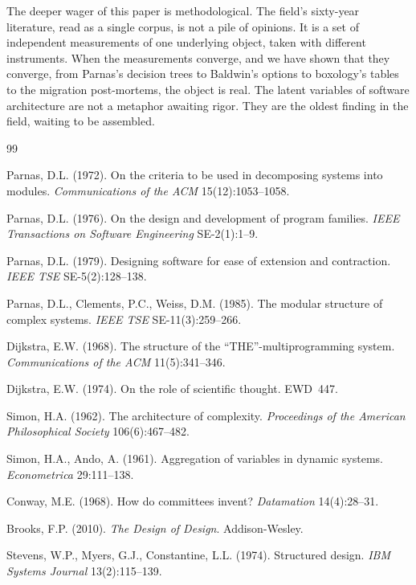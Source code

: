 \documentclass[11pt,oneside]{article}
\theoremstyle{definition}
\begin{document}
The deeper wager of this paper is methodological. The field's sixty-year literature, read as a
single corpus, is not a pile of opinions. It is a set of independent measurements of one
underlying object, taken with different instruments. When the measurements converge, and we
have shown that they converge, from Parnas's decision trees to Baldwin's options to boxology's
tables to the migration post-mortems, the object is real. The latent variables of software
architecture are not a metaphor awaiting rigor. They are the oldest finding in the field,
waiting to be assembled.

\begin{thebibliography}{99}
\small

 Parnas, D.L. (1972). On the criteria to be used in decomposing systems into
modules. \emph{Communications of the ACM} 15(12):1053--1058.

 Parnas, D.L. (1976). On the design and development of program families.
\emph{IEEE Transactions on Software Engineering} SE-2(1):1--9.

 Parnas, D.L. (1979). Designing software for ease of extension and
contraction. \emph{IEEE TSE} SE-5(2):128--138.

 Parnas, D.L., Clements, P.C., Weiss, D.M. (1985). The modular structure of
complex systems. \emph{IEEE TSE} SE-11(3):259--266.

 Dijkstra, E.W. (1968). The structure of the ``THE''-multiprogramming
system. \emph{Communications of the ACM} 11(5):341--346.

 Dijkstra, E.W. (1974). On the role of scientific thought. EWD~447.

 Simon, H.A. (1962). The architecture of complexity. \emph{Proceedings of the
American Philosophical Society} 106(6):467--482.

 Simon, H.A., Ando, A. (1961). Aggregation of variables in dynamic
systems. \emph{Econometrica} 29:111--138.

 Conway, M.E. (1968). How do committees invent? \emph{Datamation}
14(4):28--31.

 Brooks, F.P. (2010). \emph{The Design of Design}. Addison-Wesley.

 Stevens, W.P., Myers, G.J., Constantine, L.L. (1974). Structured design.
\emph{IBM Systems Journal} 13(2):115--139.


\end{thebibliography}
\end{document}
